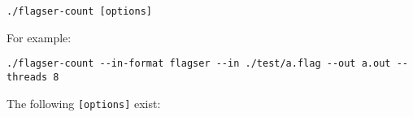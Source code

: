 \documentclass{amsart}
\theoremstyle{definition}
\begin{document}
\vspace{1em}

\begin{verbatim}./flagser-count [options]\end{verbatim}

\vspace{1em}

For example:

\vspace{1em}

\begin{verbatim}./flagser-count --in-format flagser --in ./test/a.flag --out a.out --threads 8\end{verbatim}

\vspace{1em}

\noindent
The following \texttt{[options]} exist:
\end{document}
